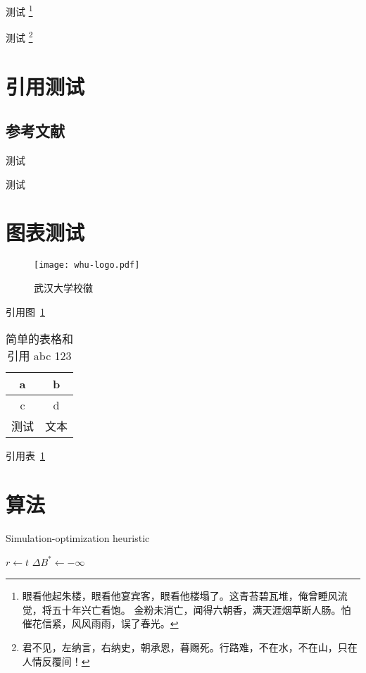 \documentclass[type = bachelor]{whu-thesis}
\begin{document}
测试 \footnote{眼看他起朱楼，眼看他宴宾客，眼看他楼塌了。这青苔碧瓦堆，俺曾睡风流觉，将五十年兴亡看饱。
金粉未消亡，闻得六朝香，满天涯烟草断人肠。怕催花信紧，风风雨雨，误了春光。}

测试 \footnote[3]{君不见，左纳言，右纳史，朝承恩，暮赐死。行路难，不在水，不在山，只在人情反覆间！}


\section{引用测试}

\subsection{参考文献}

测试 \cite{whu-bachelor:1,whu-bachelor:2,whu-bachelor:3,whu-bachelor:5,whu-bachelor:7}

测试 \cite*{whu-bachelor:1,whu-bachelor:2,whu-bachelor:3,whu-bachelor:7}



\section{图表测试}

\begin{figure}[ht]
  \centering
  \texttt{[image: whu-logo.pdf]}
  \caption{武汉大学校徽}
  \label{fig:武汉大学校徽}
\end{figure}

引用图~\ref{fig:武汉大学校徽}

\begin{table}[ht]
  \centering
  \caption{%
    简单的表格和引用 abc 123 %
  }
  \label{table:简单的表格}
  \begin{tabular}{cc}
    \hline
    a & b \\ \hline
    c & d \\ \hline
    测试 & 文本 \\ \hline
  \end{tabular}
\end{table}

引用表~\ref{table:简单的表格}


\section{算法}

\begin{algorithm}
\caption{Simulation-optimization heuristic}\label{algorithm}
$r\leftarrow t$\;
$\Delta B^{\ast}\leftarrow -\infty$\;
\end{algorithm}
\end{document}
